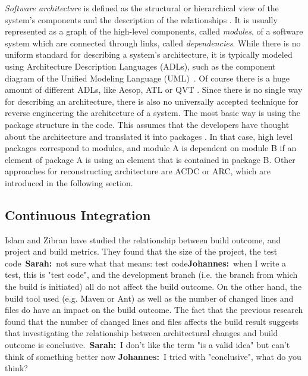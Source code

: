 \documentclass[sigplan, anonymous, review]{acmart}
\newcommand{\sn}[1]{{\color{blue}\textbf{Sarah:}~#1}}
\newcommand{\jk}[1]{{\color{violet}\textbf{Johannes:}~#1}}
\begin{document}
\textit{Software architecture} is defined as the structural or hierarchical view of the system's components and the description of the relationships \cite{arcDef}. It is usually represented as a graph of the high-level components, called \textit{modules}, of a software system which are connected through links, called \textit{dependencies}. While there is no uniform standard for describing a system's architecture, it is typically modeled using Architecture Description Languages (ADLs), such as the component diagram of the Unified Modeling Language (UML)~\cite{UML-Arch}. Of course there is a huge amount of different ADLs, like Aesop, ATL or QVT \cite{ADLs1, ADLs2}.
Since there is no single way for describing an architecture, there is also no universally accepted technique for reverse engineering the architecture of a system. The most basic way is using the package structure in the code. This assumes that the developers have thought about the architecture and translated it into packages \cite{arcPkg}. In that case, high level packages correspond to modules, and module A is dependent on module B if an element of package A is using an element that is contained in package B. 
Other approaches for reconstructing architecture are ACDC or ARC, which are introduced in the following section.

\subsection{Continuous Integration}

Islam and Zibran \cite{FailsCorr} have studied the relationship between build outcome, and project and build metrics. 
They found that the size of the project, the test code~\sn{not sure what that means: test code}\jk{when I write a test, this is "test code"}, and the development branch (i.e. the branch from which the build is initiated) all do not affect the build outcome.
On the other hand, the build tool used (e.g. Maven or Ant) as well as the number of changed lines and files do have an impact on the build outcome.
The fact that the previous research found that the number of changed lines and files affects the build result suggests that investigating the relationship between architectural changes and build outcome is conclusive.~\sn{I don't like the term "is a valid idea" but can't think of something better now} \jk{I tried with "conclusive", what do you think?}
\end{document}
